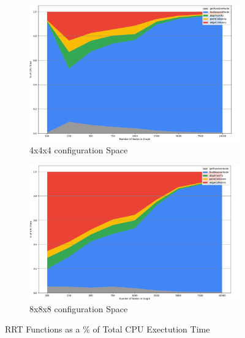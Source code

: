 \begin{figure}[H]
\begin{center}

    \begin{subfigure}{\textwidth}
    \begin{center}
    \includegraphics[width=\linewidth,height=0.3\paperheight]{chapters/chapter2/img/profiling/4x4x4/performance.png}
    \caption{4x4x4 \gls{configuration} Space}
    \label{subfig:4x4x4rrt}
    \end{center}
    \end{subfigure}
    \begin{subfigure}{\textwidth}
    \begin{center}
    \includegraphics[width=\linewidth,height=0.3\paperheight]{chapters/chapter2/img/profiling/8x8x8/performance.png}
    \caption{8x8x8 \gls{configuration} Space}
    \label{subfig:8x8x8rrt}
    \end{center}
    \end{subfigure}
    \caption{\gls{RRT} Functions as a \% of Total CPU Exectution Time}
\end{center}
\end{figure}

